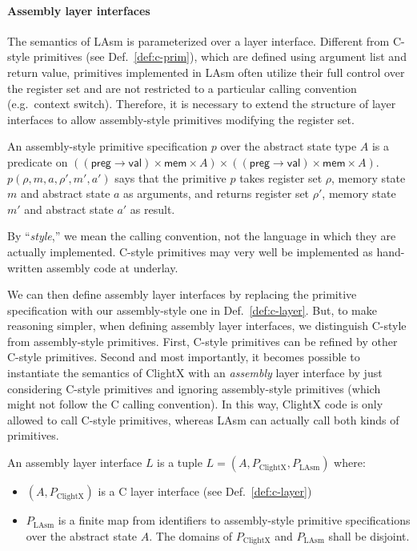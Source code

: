 \paragraph{Assembly layer interfaces}
The semantics of LAsm is parameterized over a layer interface.
Different from C-style primitives (see Def.~\ref{def:c-prim}), which are defined using
argument list and return value, primitives implemented in LAsm
often utilize their full control over the
register set and are not restricted to a particular calling convention (e.g.\ context switch).
Therefore, it is necessary to extend the structure of layer
interfaces to allow assembly-style primitives modifying the register set.

\begin{definition}
An assembly-style primitive specification $p$ over the abstract state type
$A$ is a predicate on $((\textsf{preg} \rightarrow \textsf{val}) \times \textsf{mem} \times A) \times
((\textsf{preg} \rightarrow \textsf{val}) \times \textsf{mem} \times A)$. $p(\rho, m, a,
\rho', m', a')$ says that the primitive $p$ takes
register set $\rho$, memory state $m$ and abstract state $a$ as
arguments, and returns register set $\rho'$, memory state
$m'$ and abstract state $a'$ as result.
\end{definition}

By ``\emph{style},'' we mean the calling convention,
not the language in which they are actually implemented.
C-style primitives may very well be implemented as hand-written
assembly code at underlay.

We can then define assembly layer interfaces by replacing the primitive
specification with our assembly-style one in Def.\ \ref{def:c-layer}.
But, to make reasoning simpler, when defining assembly layer interfaces,
we distinguish C-style from assembly-style primitives.
First, C-style primitives
can be refined by other C-style primitives. 
Second and most importantly, it
becomes possible to instantiate the semantics of ClightX with an
\emph{assembly} layer interface by just considering C-style primitives and ignoring
assembly-style primitives (which might not follow the C calling convention).
In this way, ClightX code is only allowed to call C-style
primitives, whereas LAsm can actually call both kinds of primitives.

\begin{definition} \label{def:asm-layer}
An assembly layer interface $L$ is a tuple
$ L = (A, P_{\mathrm{ClightX}}, P_{\mathrm{LAsm}}) $
where:
\begin{itemize}
\item $(A, P_{\mathrm{ClightX}})$ is a C layer interface (see
Def.~\ref{def:c-layer})
\item $P_{\mathrm{LAsm}}$ is a finite map from identifiers to assembly-style
primitive specifications over the abstract state $A$. The domains of
$P_{\mathrm{ClightX}}$ and $P_{\mathrm{LAsm}}$ shall be disjoint.
\end{itemize}
\end{definition}


